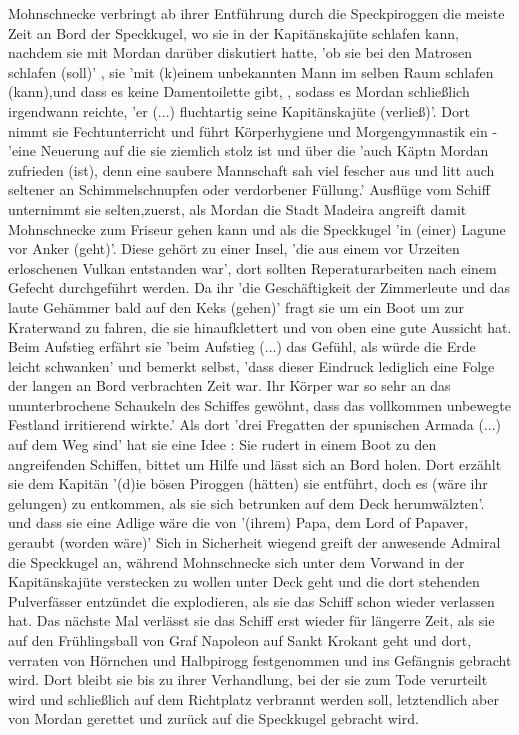Mohnschnecke verbringt ab ihrer Entführung durch die Speckpiroggen \cite[S.32]{pir} die meiste Zeit an Bord der Speckkugel, wo sie in der Kapitänskajüte schlafen kann, nachdem sie mit Mordan darüber diskutiert hatte, 'ob sie bei den Matrosen schlafen (soll)' \cite[S.78]{pir}, sie 'mit (k)einem unbekannten Mann im selben Raum schlafen (kann),\cite[S.78]{pir}und dass es keine Damentoilette gibt, \cite[S.78]{pir}, sodass es Mordan schließlich irgendwann reichte, \cite[S.78]{pir} 'er (...) fluchtartig seine Kapitänskajüte (verließ)'.\cite[S.78]{pir} Dort nimmt sie Fechtunterricht \cite[S.127f]{pir} und führt Körperhygiene und Morgengymnastik ein - 'eine Neuerung auf die sie ziemlich stolz ist \cite[S.181]{pir} und über die 'auch Käptn Mordan zufrieden (ist), denn eine saubere Mannschaft sah viel fescher aus und litt auch seltener an Schimmelschnupfen oder verdorbener Füllung.'\cite[S.181]{pir} Ausflüge vom Schiff unternimmt sie selten,zuerst, als Mordan die Stadt Madeira angreift \cite[S.186ff]{pir} damit Mohnschnecke zum Friseur gehen kann \cite[S.195]{pir} und als die Speckkugel 'in (einer) Lagune vor Anker (geht)'.\cite[S.247]{pir} Diese gehört zu einer Insel, 'die aus einem vor Urzeiten erloschenen Vulkan entstanden war',\cite[S.246]{pir} dort sollten Reperaturarbeiten nach einem Gefecht durchgeführt werden.\cite[S.245f]{pir} Da ihr 'die Geschäftigkeit der Zimmerleute und das laute Gehämmer bald auf den Keks (gehen)'\cite[S.247]{pir} fragt sie um ein Boot um zur Kraterwand zu fahren, die sie hinaufklettert und von oben eine gute Aussicht hat. \cite[S.247f]{pir} Beim Aufstieg erfährt sie 'beim Aufstieg (...) das Gefühl, als würde die Erde leicht schwanken'\cite[S.248]{pir} und bemerkt selbst, 'dass dieser Eindruck lediglich eine Folge der langen an Bord verbrachten Zeit war. Ihr Körper war so sehr an das ununterbrochene Schaukeln des Schiffes gewöhnt, dass das vollkommen unbewegte Festland irritierend wirkte.'\cite[S.248]{pir} Als dort 'drei Fregatten der spunischen Armada (...) auf dem Weg sind'\cite[S.250]{pir} hat sie eine Idee \cite[S.251]{pir}: Sie rudert in einem Boot zu den angreifenden Schiffen, bittet um Hilfe und lässt sich an Bord holen. Dort erzählt sie dem Kapitän '(d)ie bösen Piroggen (hätten) sie entführt, doch es (wäre ihr gelungen) zu entkommen, als sie sich betrunken auf dem Deck herumwälzten'.\cite[S.254]{pir} und dass sie eine Adlige wäre die von '(ihrem) Papa, dem Lord of Papaver, geraubt (worden wäre)'\cite[S.255]{pir} Sich in Sicherheit wiegend greift der anwesende Admiral die Speckkugel an, während Mohnschnecke sich unter dem Vorwand in der Kapitänskajüte verstecken zu wollen unter Deck geht und die dort stehenden Pulverfässer entzündet die explodieren, als sie das Schiff schon wieder verlassen hat. \cite[S.257ff]{pir} Das nächste Mal verlässt sie das Schiff erst wieder für längerre Zeit, als sie auf den Frühlingsball von Graf Napoleon auf Sankt Krokant geht\cite[S.542]{pir} und dort, verraten von Hörnchen und Halbpirogg festgenommen\cite[S.549ff]{pir}  und ins Gefängnis gebracht wird.\cite[S.549]{pir} Dort bleibt sie bis zu ihrer Verhandlung, bei der sie zum Tode verurteilt wird\cite[S.569]{pir} und schließlich auf dem Richtplatz verbrannt werden soll, letztendlich aber von Mordan gerettet und zurück auf die Speckkugel gebracht wird.\cite[S.607]{pir} 